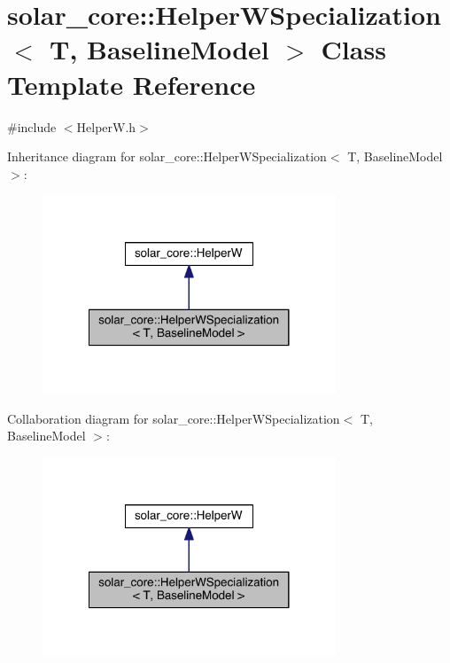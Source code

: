 \hypertarget{classsolar__core_1_1_helper_w_specialization_3_01_t_00_01_baseline_model_01_4}{}\section{solar\+\_\+core\+:\+:Helper\+W\+Specialization$<$ T, Baseline\+Model $>$ Class Template Reference}
\label{classsolar__core_1_1_helper_w_specialization_3_01_t_00_01_baseline_model_01_4}


{\ttfamily \#include $<$Helper\+W.\+h$>$}



Inheritance diagram for solar\+\_\+core\+:\+:Helper\+W\+Specialization$<$ T, Baseline\+Model $>$\+:
\nopagebreak
\begin{figure}[H]
\begin{center}
\leavevmode
\includegraphics[width=248pt]{classsolar__core_1_1_helper_w_specialization_3_01_t_00_01_baseline_model_01_4__inherit__graph}
\end{center}
\end{figure}


Collaboration diagram for solar\+\_\+core\+:\+:Helper\+W\+Specialization$<$ T, Baseline\+Model $>$\+:
\nopagebreak
\begin{figure}[H]
\begin{center}
\leavevmode
\includegraphics[width=248pt]{classsolar__core_1_1_helper_w_specialization_3_01_t_00_01_baseline_model_01_4__coll__graph}
\end{center}
\end{figure}
